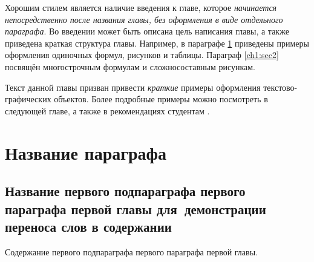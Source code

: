 
Хорошим стилем является наличие введения к главе, которое \textit{начинается непосредственно после названия главы, без оформления в виде отдельного параграфа}. Во введении может быть описана цель написания главы, а также приведена краткая структура главы. Например, в параграфе \ref{ch1:sec1} приведены примеры оформления одиночных формул, рисунков и таблицы. Параграф \ref{ch1:sec2} посвящён многострочным формулам и сложносоставным рисункам.

Текст данной главы призван привести \textit{краткие} примеры оформления текстово-графических объектов. Более подробные примеры можно посмотреть в следующей главе, а также в рекомендациях студентам \cite{spbpu-student-thesis-template-author-guide}. 


\section{Название параграфа} \label{ch1:sec1}


\subsection{Название первого подпараграфа первого параграфа первой главы для~демонстрации переноса слов в содержании} %

Содержание первого подпараграфа первого параграфа первой главы.




